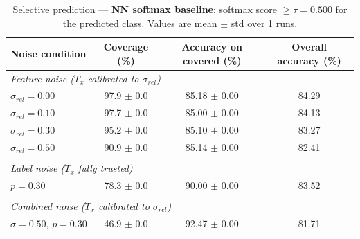 \begin{table}[ht]
\centering
\caption{Selective prediction — \textbf{NN softmax baseline}: softmax score $\geq \tau = 0.500$ for the predicted class. Values are mean $\pm$ std over 1 runs.}
\label{tab:thresh-nn-0-5}
\begin{tabular}{lccc}
\toprule
Noise condition & Coverage (\%) & Accuracy on covered (\%) & Overall accuracy (\%) \\
\midrule
\multicolumn{4}{l}{\textit{Feature noise ($T_x$ calibrated to $\sigma_{rel}$)}} \\
$\sigma_{rel}=0.00$ & 97.9 $\pm$ 0.0 & 85.18 $\pm$ 0.00 & 84.29 \\
$\sigma_{rel}=0.10$ & 97.7 $\pm$ 0.0 & 85.00 $\pm$ 0.00 & 84.13 \\
$\sigma_{rel}=0.30$ & 95.2 $\pm$ 0.0 & 85.10 $\pm$ 0.00 & 83.27 \\
$\sigma_{rel}=0.50$ & 90.9 $\pm$ 0.0 & 85.14 $\pm$ 0.00 & 82.41 \\
\midrule \\
\multicolumn{4}{l}{\textit{Label noise ($T_x$ fully trusted)}} \\
$p=0.30$ & 78.3 $\pm$ 0.0 & 90.00 $\pm$ 0.00 & 83.52 \\
\midrule \\
\multicolumn{4}{l}{\textit{Combined noise ($T_x$ calibrated to $\sigma_{rel}$)}} \\
$\sigma=0.50,\,p=0.30$ & 46.9 $\pm$ 0.0 & 92.47 $\pm$ 0.00 & 81.71 \\
\bottomrule
\end{tabular}
\end{table}